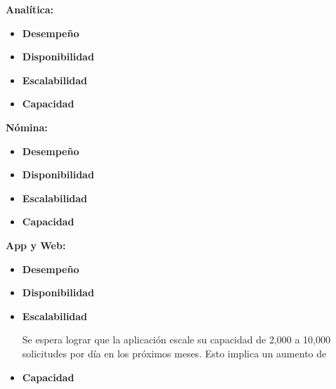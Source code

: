 \documentclass[a4paper]{article}
\begin{document}
\textbf{Analítica:}
\begin{itemize}
    \item \textbf{Desempeño}
    \item \textbf{Disponibilidad}
    \item \textbf{Escalabilidad}
    \item \textbf{Capacidad}
\end{itemize}

\textbf{Nómina:}
\begin{itemize}
    \item \textbf{Desempeño}
    \item \textbf{Disponibilidad}
    \item \textbf{Escalabilidad}
    \item \textbf{Capacidad}
\end{itemize}

\textbf{App y Web:}
\begin{itemize}
    \item \textbf{Desempeño}
    \item \textbf{Disponibilidad}
    \item \textbf{Escalabilidad} 
    
    Se espera lograr que la aplicación escale su capacidad de 
    2,000 a 10,000 solicitudes por día en los próximos meses. Esto
    implica un aumento de 
    
    \item \textbf{Capacidad}
\end{itemize}
\end{document}

